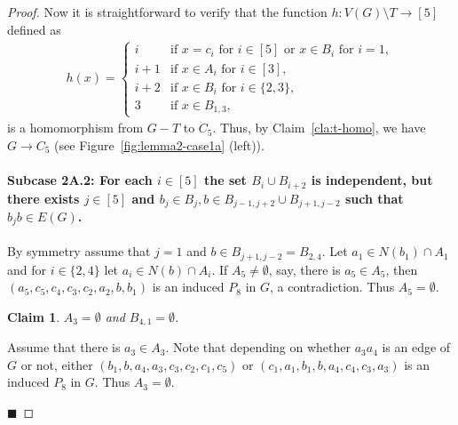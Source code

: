 \documentclass[11pt,a4paper]{article}
\theoremstyle{mystyle}
\newtheorem{claim}{Claim}[theorem]
\newenvironment{claimproof}{\noindent {\emph{Proof of Claim.}}}{\hfill$\blacksquare$\medskip}
\newcommand{\jorik}[1]{\textcolor{blue}{Comment by Jorik: #1}}
\begin{document}
\begin{proof}
Now it is straightforward to verify that the function $h : V(G) \setminus T \to [5]$ defined as
\begin{align*}
h(x)=\begin{cases}
i & \textrm{if }x=c_i \textrm{ for }i\in [5] \textrm{ or }x\in B_i \textrm{ for }i=1, \\
i+1 & \textrm{if }x\in A_i \textrm{ for }i\in [3], \\
i+2 & \textrm{if }x\in B_i\textrm{ for }i\in \{2,3\}, \\ 
3 & \textrm{if }x\in B_{1,3},
\end{cases}
\end{align*}
is a homomorphism from $G - T$ to $C_5$. Thus, by Claim~\ref{cla:t-homo}, we have $G \to C_5$ (see Figure~\ref{fig:lemma2-case1a} (left)).


\paragraph{Subcase 2A.2: For each $i \in [5]$ the set $B_i \cup B_{i+2}$ is independent, but there exists $j \in [5]$ and $b_j \in B_j, b \in B_{j-1,j+2} \cup B_{j+1,j-2}$ such that $b_jb \in E(G)$. }
By symmetry assume that $j=1$ and $b\in B_{j+1,j-2}=B_{2,4}$.
Let $a_1  \in N(b_1) \cap A_1$ and for $i \in \{2,4\}$ let $a_i \in N(b) \cap A_i$. 
If $A_5 \neq \emptyset$, say, there is $a_5 \in A_5$, then $(a_5,c_5,c_4,c_3,c_2,a_2,b,b_1)$ is an induced $P_8$ in $G$, a contradiction.
Thus $A_5=\emptyset$. %

\begin{claim}
    $A_3=\emptyset$ and $B_{4,1}=\emptyset$.
\end{claim}
\begin{claimproof}
Assume that there is $a_3 \in A_3$. Note that depending on whether $a_3a_4$ is an edge of $G$ or not, either $(b_{1},b,a_4,a_3,c_3,c_2,c_1,c_5)$ or $(c_1,a_1,b_1,b,a_4,c_4,c_3,a_3)$ is an induced $P_8$ in $G$. Thus $A_3=\emptyset$.


\end{claimproof}
\end{proof}
\end{document}
